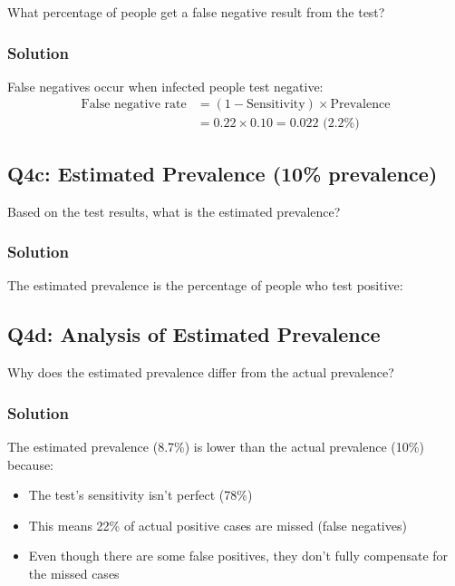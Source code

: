 \documentclass{article}
\begin{document}
What percentage of people get a false negative result from the test?

\subsubsection*{Solution}

False negatives occur when infected people test negative:
\begin{align}
\text{False negative rate} &= (1 - \text{Sensitivity}) \times \text{Prevalence}\\
&= 0.22 \times 0.10 = 0.022 \text{ (2.2\%)}
\end{align}


\subsection*{Q4c: Estimated Prevalence (10\% prevalence)}

Based on the test results, what is the estimated prevalence?

\subsubsection*{Solution}

The estimated prevalence is the percentage of people who test positive:


\subsection*{Q4d: Analysis of Estimated Prevalence}

Why does the estimated prevalence differ from the actual prevalence?

\subsubsection*{Solution}

The estimated prevalence (8.7\%) is lower than the actual prevalence (10\%) because:
\begin{itemize}
    \item The test's sensitivity isn't perfect (78\%)
    \item This means 22\% of actual positive cases are missed (false negatives)
    \item Even though there are some false positives, they don't fully compensate for the missed cases
\end{itemize}
\end{document}

